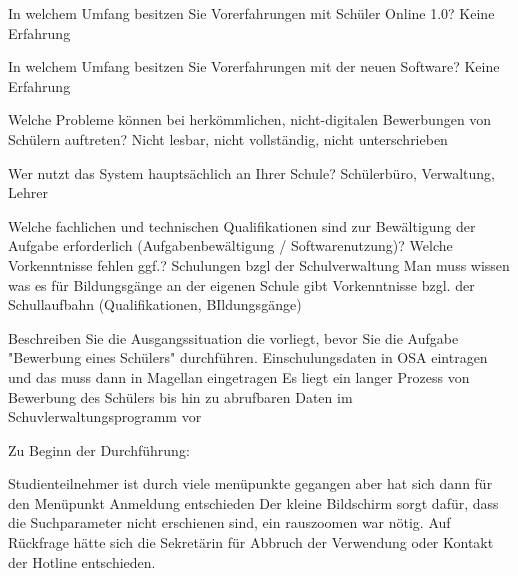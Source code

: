 In welchem Umfang besitzen Sie Vorerfahrungen mit Schüler Online 1.0? 	
Keine Erfahrung					

In welchem Umfang besitzen Sie Vorerfahrungen mit der neuen Software?	
Keine Erfahrung		










Welche Probleme können bei herkömmlichen, nicht-digitalen Bewerbungen von Schülern auftreten?	
Nicht lesbar, nicht vollständig, nicht unterschrieben				








Wer nutzt das System hauptsächlich an Ihrer Schule?	
Schülerbüro, Verwaltung, Lehrer










Welche fachlichen und technischen Qualifikationen sind zur Bewältigung der Aufgabe erforderlich (Aufgabenbewältigung / Softwarenutzung)?
Welche Vorkenntnisse fehlen ggf.?	
Schulungen bzgl der Schulverwaltung
Man muss wissen was es für Bildungsgänge an der eigenen Schule gibt
Vorkenntnisse bzgl. der Schullaufbahn (Qualifikationen, BIldungsgänge)








Beschreiben Sie die Ausgangssituation die vorliegt, bevor Sie die Aufgabe "Bewerbung eines Schülers" durchführen.	
Einschulungsdaten in OSA eintragen und das muss dann in Magellan eingetragen
Es liegt ein langer Prozess von Bewerbung des Schülers bis hin zu abrufbaren Daten im Schuvlerwaltungsprogramm vor
	
















Zu Beginn der Durchführung:					


Studienteilnehmer ist durch viele menüpunkte gegangen aber hat sich dann für den Menüpunkt Anmeldung entschieden
Der kleine Bildschirm sorgt dafür, dass die Suchparameter nicht erschienen sind, ein rauszoomen war nötig. 
Auf Rückfrage hätte sich die Sekretärin für Abbruch der Verwendung oder Kontakt der Hotline entschieden. 		


